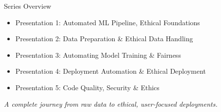 \documentclass[aspectratio=169]{beamer}
\begin{document}
%
%
\begin{frame}{Series Overview}
\begin{itemize}
\item Presentation 1: Automated ML Pipeline, Ethical Foundations
\item Presentation 2: Data Preparation \& Ethical Data Handling
\item Presentation 3: Automating Model Training \& Fairness
\item Presentation 4: Deployment Automation \& Ethical Deployment
\item Presentation 5: Code Quality, Security \& Ethics
\end{itemize}

\vspace{0.8em}
\emph{A complete journey from raw data to ethical, user-focused deployments.}
\end{frame}
\end{document}

